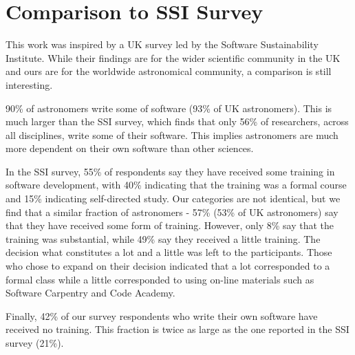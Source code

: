 \section{Comparison to SSI Survey}
\label{sec:ssicompare}

This work was inspired by a UK survey led by the Software Sustainability Institute. While their findings are for the wider scientific community in the UK and ours are for the worldwide astronomical community, a comparison is still interesting. 

90\% of astronomers write some of software (93\% of UK astronomers). This is much larger than the SSI survey, which finds that only 56\% of researchers, across all disciplines, write some of their software.  This implies astronomers are much more dependent on their own software than other sciences.

In the SSI survey, 55\% of respondents say they have received some training in software development, with 40\% indicating that the training was a formal course and 15\% indicating self-directed study. Our categories are not identical, but we find that a similar fraction of astronomers - 57\% (53\% of UK astronomers) say that they have received some form of training. However, only 8\% say that the training was substantial, while 49\% say they received a little training. The decision what constitutes a lot and a little was left to the participants. Those who chose to expand on their decision indicated that a lot corresponded to a formal class while a little corresponded to using on-line materials such as Software Carpentry and Code Academy.

Finally, 42\% of our survey respondents who write their own software have received no training. This fraction is twice as large as the one reported in the SSI survey (21\%).  

